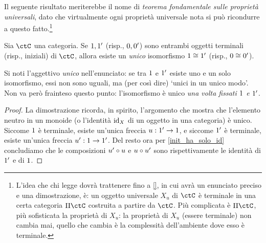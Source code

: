 



Il seguente risultato meriterebbe il nome di \emph{teorema fondamentale sulle proprietà universali}, dato che virtualmente ogni proprietà universale nota si può ricondurre a questo fatto.\footnote{L'idea che chi legge dovrà trattenere fino a \ref{}, in cui avrà un enunciato preciso e una dimostrazione, è: un oggetto universale \(X_u\) di \(\ctC\) è terminale in una certa categoria \(\Pi\ctC\) costruita a partire da \(\ctC\). Più complicata è \(\Pi\ctC\), più sofisticata la proprietà di \(X_u\): la proprietà di \(X_u\) (essere terminale) non cambia mai, quello che cambia è la complessità dell'ambiente dove esso è terminale.}
\begin{proposition}
	Sia $\ctC$ una categoria. Se $1,1'$ (risp., $0,0'$) sono entrambi oggetti terminali (risp., iniziali) di $\ctC$, allora esiste un \emph{unico} isomorfismo $1\cong1'$ (risp., $0\cong 0'$).
\end{proposition}
Si noti l'aggettivo \emph{unico} nell'enunciato: se tra $1$ e $1'$ esiste uno e un solo isomorfismo, essi non sono uguali, ma (per così dire) `unici in un unico modo'. Non va però frainteso questo punto: l'isomorfismo è unico \emph{una volta fissati $1$ e $1'$}.
\begin{proof}
	La dimostrazione ricorda, in spirito, l'argomento che mostra che l'elemento neutro in un monoide (o l'identità $\mathrm{id}_X$ di un oggetto in una categoria) è unico. Siccome $1$ è terminale, esiste un'unica freccia $u : 1'\to 1$, e siccome $1'$ è terminale, esiste un'unica freccia $u' : 1\to1'$. Del resto ora per \ref{init_ha_solo_id} concludiamo che le composizioni $u'\circ u$ e $u\circ u'$ sono rispettivamente le identità di $1'$ e di $1$.
\end{proof}
\begin{remark}
\end{remark}


